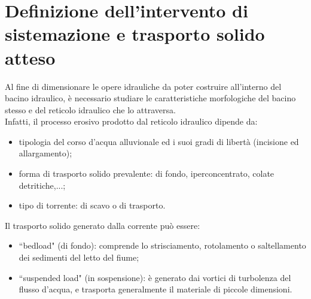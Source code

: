 \section{Definizione dell'intervento di sistemazione e trasporto solido atteso}
Al fine di dimensionare le opere idrauliche da poter costruire all'interno del bacino idraulico, è necessario studiare le caratteristiche morfologiche del bacino stesso e del reticolo idraulico che lo attraversa.\\
Infatti, il processo erosivo prodotto dal reticolo idraulico dipende da:
\begin{itemize}
    \item tipologia del corso d'acqua alluvionale ed i suoi gradi di libertà (incisione ed allargamento);
    \item forma di trasporto solido prevalente: di fondo, iperconcentrato, colate detritiche,...;
    \item tipo di torrente: di scavo o di trasporto.
\end{itemize}
Il trasporto solido generato dalla corrente può essere:
\begin{itemize}
    \item ``bedload" (di fondo): comprende lo strisciamento, rotolamento o saltellamento dei sedimenti del letto del fiume;
    \item ``suspended load" (in sospensione): è generato dai vortici di turbolenza del flusso d'acqua, e trasporta generalmente il materiale di piccole dimensioni.
\end{itemize} 
